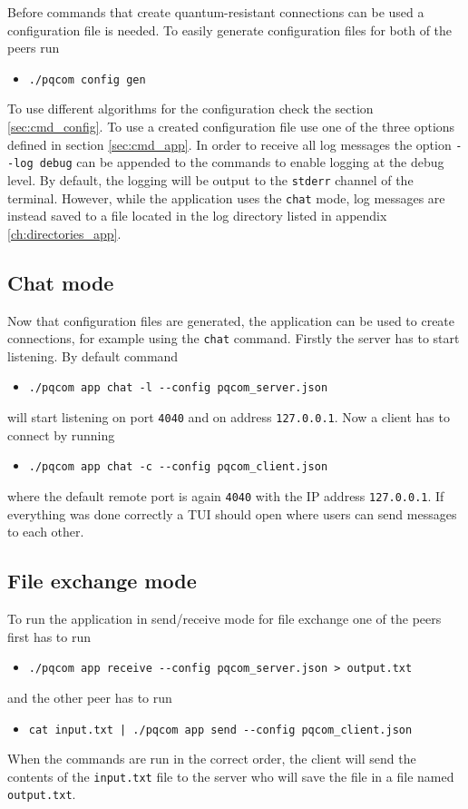 Before commands that create quantum-resistant connections can be used a configuration file is needed. To easily generate configuration files for both of the peers run
\begin{itemize}
  \item \texttt{./pqcom config gen}
\end{itemize}
To use different algorithms for the configuration check the section \ref{sec:cmd_config}. To use a created configuration file use one of the three options defined in section \ref{sec:cmd_app}. In order to receive all log messages the option \texttt{-\--log debug} can be appended to the commands to enable logging at the debug level. By default, the logging will be output to the \texttt{stderr} channel of the terminal. However, while the application uses the \texttt{chat} mode, log messages are instead saved to a file located in the log directory listed in appendix \ref{ch:directories_app}.

\subsection{Chat mode}
Now that configuration files are generated, the application can be used to create connections, for example using the \texttt{chat} command. Firstly the server has to start listening. By default command
\begin{itemize}
  \item \texttt{./pqcom app chat -l -\--config pqcom\_server.json}
\end{itemize}
will start listening on port \texttt{4040} and on address \texttt{127.0.0.1}. Now a client has to connect by running
\begin{itemize}
  \item \texttt{./pqcom app chat -c -\--config pqcom\_client.json}
\end{itemize}
where the default remote port is again \texttt{4040} with the IP address \texttt{127.0.0.1}. If everything was done correctly a TUI should open where users can send messages to each other.

\subsection{File exchange mode}
To run the application in send/receive mode for file exchange one of the peers first has to run
\begin{itemize}
  \item \texttt{./pqcom app receive -\--config pqcom\_server.json > output.txt}
\end{itemize}
and the other peer has to run
\begin{itemize}
  \item \texttt{cat input.txt | ./pqcom app send -\--config pqcom\_client.json}
\end{itemize}
When the commands are run in the correct order, the client will send the contents of the \texttt{input.txt} file to the server who will save the file in a file named \texttt{output.txt}.

